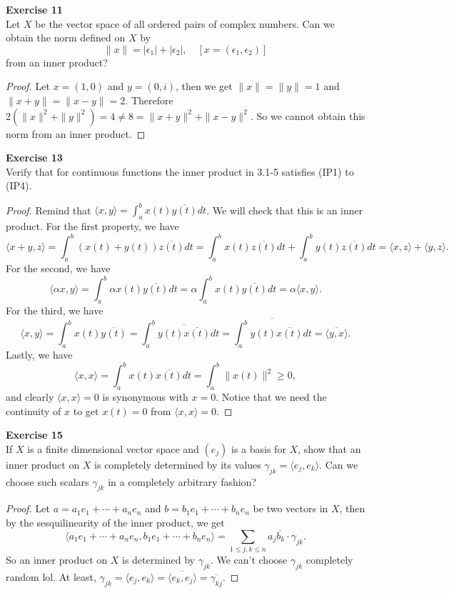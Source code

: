 \documentclass[12pt, a4paper]{article}
\theoremstyle{plain}
\newenvironment{exercise}[2][Exercise]
    { \begin{mdframed}[backgroundcolor=gray!20] \textbf{#1 #2} \\}
    {  \end{mdframed}}
\begin{document}
\pagebreak

\begin{exercise}{11}
Let $X$ be the vector space of all ordered pairs of complex numbers. Can we obtain the norm defined on $X$ by
\[
\|x\| = |\epsilon_1|+|\epsilon_2|,\quad [x=(\epsilon_1,\epsilon_2)]
\]
from an inner product?
\end{exercise}
	\begin{proof}
	Let $x=(1,0)$ and $y=(0,i)$, then we get $\|x\| = \|y\| = 1$ and $\|x+y\| = \|x-y\| = 2$. Therefore $2(\|x\|^2+\|y\|^2) = 4 \neq 8 = \|x+y\|^2+\|x-y\|^2$. So we cannot obtain this norm from an inner product.
	\end{proof}

\begin{exercise}{13}
Verify that for continuous functions the inner product in 3.1-5 satisfies (IP1) to (IP4).
\end{exercise}
	\begin{proof}
	Remind that $\langle{x,y}\rangle = \int_{a}^{b}{x(t)\overline{y(t)}dt}$. We will check that this is an inner product. For the first property, we have
	\[
	\langle{x+y,z}\rangle = \int_{a}^{b}{(x(t)+y(t))\overline{z(t)}dt} = \int_{a}^{b}{x(t)\overline{z(t)}dt}+\int_{a}^{b}{y(t)\overline{z(t)}dt} = \langle{x,z}\rangle + \langle{y,z}\rangle.
	\]
	For the second, we have
	\[
	\langle{\alpha x,y}\rangle = \int_{a}^{b}{\alpha x(t)\overline{y(t)}dt} = \alpha \int_{a}^{b}{x(t)\overline{y(t)}dt} = \alpha\langle{x,y}\rangle.
	\]
	For the third, we have
	\[
	\langle{x,y}\rangle = \int_{a}^{b}{x(t)\overline{y(t)}} = \int_{a}^{b}{\overline{y(t)\overline{x(t)}}dt} = \overline{\int_{a}^{b}{y(t)\overline{x(t)}dt}} = \overline{\langle{y,x}\rangle}.
	\]
	Lastly, we have
	\[
	\langle{x,x}\rangle = \int_{a}^{b}{x(t)\overline{x(t)}dt} = \int_{a}^{b}{\|x(t)\|^2} \geq 0,
	\]
	and clearly $\langle{x,x}\rangle = 0$ is synonymous with $x=0$. Notice that we need the continuity of $x$ to get $x(t)=0$ from $\langle{x,x}\rangle = 0$.
	\end{proof}

\pagebreak

\begin{exercise}{15}
If $X$ is a finite dimensional vector space and $(e_j)$ is a basis for $X$, show that an inner product on $X$ is completely determined by its values $\gamma_{jk}=\langle{e_j,e_k}\rangle$. Can we choose such scalars $\gamma_{jk}$ in a completely arbitrary fashion?
\end{exercise}
	\begin{proof}
	Let $a = a_1e_1+\cdots+a_ne_n$ and $b = b_1e_1+\cdots+b_ne_n$ be two vectors in $X$, then by the sesquilinearity of the inner product, we get
	\[
	\langle{a_1e_1+\cdots+a_ne_n,b_1e_1+\cdots+b_ne_n}\rangle = \sum_{1\leq j,k\leq n}a_j\overline{b_k}\cdot \gamma_{jk}.
	\]
	So an inner product on $X$ is determined by $\gamma_{jk}$. We can't choose $\gamma_{jk}$ completely random lol. At least, $\gamma_{jk}=\langle{e_j,e_k}\rangle = \overline{\langle{e_k,e_j}\rangle} = \overline{\gamma_{kj}}$.
	\end{proof}
\end{document}
